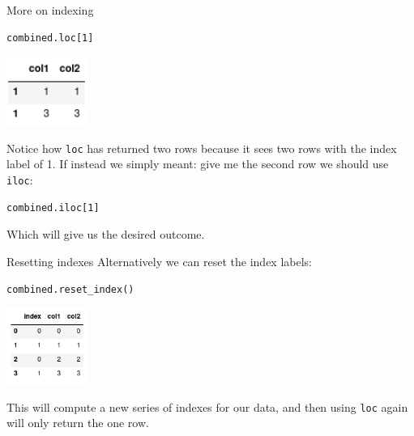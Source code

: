 \documentclass[10pt]{beamer}
\begin{document}
\begin{frame}[label={sec:orgf5c672c},fragile]{More on indexing}
 \begin{verbatim}
combined.loc[1]
\end{verbatim}

\begin{center}
\includegraphics[width=0.2\textwidth]{images/indexing.png}
\end{center}

Notice how \texttt{loc} has returned two rows because it sees two rows with the index
label of 1. If instead we simply meant: give me the second row we should use
\texttt{iloc}:

\begin{verbatim}
combined.iloc[1]
\end{verbatim}

Which will give us the desired outcome.
\end{frame}

\begin{frame}[label={sec:org81fe61e},fragile]{Resetting indexes}
 Alternatively we can reset the index labels:

\begin{verbatim}
combined.reset_index()
\end{verbatim}

\begin{center}
\includegraphics[width=0.2\textwidth]{images/reset-index.png}
\end{center}

This will compute a new series of indexes for our data, and then using \texttt{loc} again
will only return the one row.
\end{frame}
\end{document}
